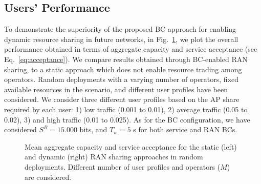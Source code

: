 \documentclass[conference]{IEEEtran}
\theoremstyle{definition}
\begin{document}
\subsection{Users' Performance}
To demonstrate the superiority of the proposed BC approach for enabling dynamic resource sharing in future networks, in Fig.~\ref{fig:performance_random_deployments}, we plot the overall performance obtained in terms of aggregate capacity and service acceptance (see Eq.~\eqref{eq:acceptance}). We compare results obtained through BC-enabled RAN sharing, to a static approach which does not enable resource trading among operators. Random deployments with a varying number of operators, fixed available resources in the scenario, and different user profiles have been considered. We consider three different user profiles based on the AP share required by each user: 1) low traffic (0.001 to 0.01), 2) average traffic (0.05 to 0.02), 3) and high traffic (0.01 to 0.025). As for the BC configuration, we have considered $S^B = 15.000$ bits, and $T_w = 5$ s for both service and RAN BCs.
\begin{figure}[ht!]
\centering
{} 
\caption{Mean aggregate capacity and service acceptance for the static (left) and dynamic (right) RAN sharing approaches in random deployments. Different number of user profiles and operators ($M$) are considered.}
\label{fig:performance_random_deployments}
\end{figure}
\end{document}
